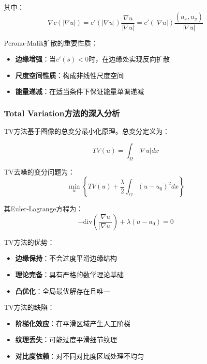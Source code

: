 \documentclass[a4paper,12pt]{ctexart}
\begin{document}
其中：
\begin{equation}
\nabla c(|\nabla u|) = c'(|\nabla u|) \frac{\nabla u}{|\nabla u|} = c'(|\nabla u|) \frac{(u_x, u_y)}{|\nabla u|}
\end{equation}

Perona-Malik扩散的重要性质：

\begin{itemize}
    \item \textbf{边缘增强}：当$c'(s) < 0$时，在边缘处实现反向扩散
    \item \textbf{尺度空间性质}：构成非线性尺度空间
    \item \textbf{能量递减}：在适当条件下保证能量单调递减
\end{itemize}

\subsubsection{Total Variation方法的深入分析}

TV方法基于图像的总变分最小化原理。总变分定义为：

\begin{equation}
TV(u) = \int_{\Omega} |\nabla u| dx
\end{equation}

TV去噪的变分问题为：
\begin{equation}
\min_u \left\{ TV(u) + \frac{\lambda}{2} \int_{\Omega} (u - u_0)^2 dx \right\}
\end{equation}

其Euler-Lagrange方程为：
\begin{equation}
-\text{div}\left(\frac{\nabla u}{|\nabla u|}\right) + \lambda(u - u_0) = 0
\end{equation}

TV方法的优势：
\begin{itemize}
    \item \textbf{边缘保持}：不会过度平滑边缘结构
    \item \textbf{理论完备}：具有严格的数学理论基础
    \item \textbf{凸优化}：全局最优解存在且唯一
\end{itemize}

TV方法的缺陷：
\begin{itemize}
    \item \textbf{阶梯化效应}：在平滑区域产生人工阶梯
    \item \textbf{纹理丢失}：可能过度平滑细节纹理
    \item \textbf{对比度依赖}：对不同对比度区域处理不均匀
\end{itemize}
\end{document}
